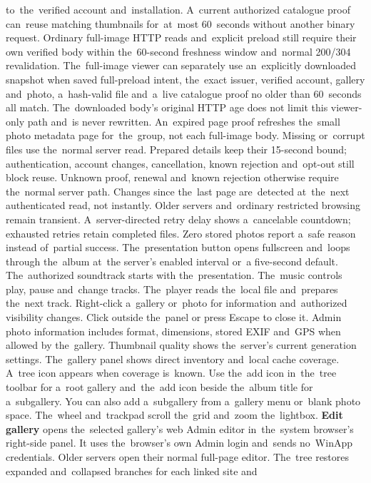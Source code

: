 \documentclass[11pt,a4paper]{article}
\newcommand{\ui}[1]{\textbf{#1}}
\begin{document}
to~the~verified account and~installation. A~current authorized catalogue proof
can~reuse matching thumbnails for~at~most 60~seconds without another binary
request. Ordinary full-image HTTP reads and~explicit preload still require
their own verified body within the~60-second freshness window and~normal
200/304 revalidation. The~full-image viewer can separately use an~explicitly
downloaded snapshot when saved full-preload intent, the~exact issuer, verified
account, gallery and~photo, a~hash-valid file and~a~live catalogue proof no
older than 60~seconds all match. The~downloaded body’s original HTTP age does
not limit this viewer-only path and~is never rewritten. An~expired page proof
refreshes the~small photo metadata page for~the~group, not each full-image
body. Missing or~corrupt files use the~normal server read. Prepared details
keep their 15-second bound; authentication, account changes, cancellation,
known rejection and~opt-out still block reuse. Unknown proof, renewal and~known
rejection otherwise require the~normal server path. Changes since the~last
page are~detected at~the~next authenticated read, not instantly.
Older servers and~ordinary restricted browsing remain transient.
A~server-directed retry delay shows a~cancelable countdown; exhausted
retries retain completed files. Zero stored photos report a~safe reason
instead of~partial success.
The~presentation button opens fullscreen and~loops through the~album at~the
server's enabled interval or~a five-second default. The~authorized soundtrack
starts with the~presentation. The~music controls play, pause and~change tracks.
The~player reads the~local file and~prepares the~next track.
Right-click a~gallery or~photo for information and~authorized visibility
changes. Click outside the~panel or press Escape to close it. Admin photo
information includes format, dimensions, stored EXIF and~GPS when allowed by
the~gallery. Thumbnail quality shows the~server's current generation settings.
The~gallery panel shows direct inventory and~local cache coverage.
A~tree icon appears
when coverage is~known. Use the~add icon in~the~tree toolbar for a~root
gallery and~the~add icon beside the~album title for a~subgallery. You can
also add a~subgallery from a~gallery menu or~blank photo space.
The~wheel and~trackpad scroll the~grid and~zoom the~lightbox.
\ui{Edit gallery} opens the~selected gallery's web Admin editor in~the~system
browser's right-side panel. It uses the~browser's own Admin login and~sends
no~WinApp credentials. Older servers open their normal full-page editor.
The~tree restores expanded and~collapsed branches for each linked site and
\end{document}

